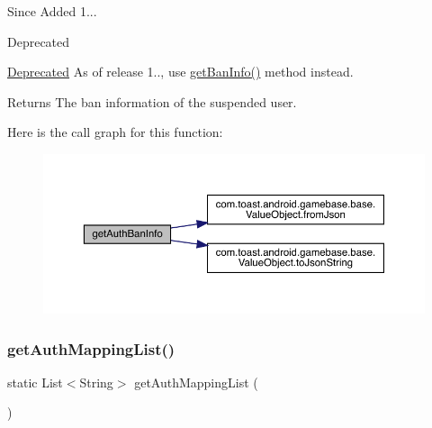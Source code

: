 \begin{DoxySince}{Since}
Added 1... 
\end{DoxySince}
\begin{DoxyRefDesc}{Deprecated}
\item[\hyperlink{deprecated__deprecated000001}{Deprecated}]As of release 1.., use \hyperlink{classcom_1_1toast_1_1android_1_1gamebase_1_1_gamebase_a61447d8f3f3a655ea83649465da9df62}{get\+Ban\+Info()} method instead. \end{DoxyRefDesc}
\begin{DoxyReturn}{Returns}
The ban information of the suspended user. 
\end{DoxyReturn}
Here is the call graph for this function\+:\nopagebreak
\begin{figure}[H]
\begin{center}
\leavevmode
\includegraphics[width=350pt]{classcom_1_1toast_1_1android_1_1gamebase_1_1_gamebase_ad2da4e502aade3b2c9434fc1470e3425_cgraph}
\end{center}
\end{figure}
\mbox{\label{classcom_1_1toast_1_1android_1_1gamebase_1_1_gamebase_abc355ef4a49b5c6348ee31890df16431}} 
\subsubsection{\texorpdfstring{get\+Auth\+Mapping\+List()}{getAuthMappingList()}}
{\footnotesize\ttfamily static List$<$String$>$ get\+Auth\+Mapping\+List (\begin{DoxyParamCaption}{ }\end{DoxyParamCaption})\hspace{0.3cm}{\ttfamily [static]}}



